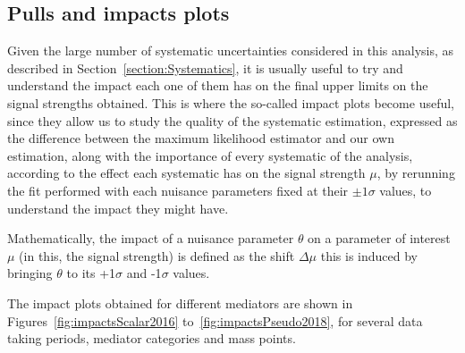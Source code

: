 \documentclass[a4paper, 10pt, openright]{report}
\begin{document}
\begin{appendices}
\chapter{Pulls and impacts plots} \label{appendix:Impact}

Given the large number of systematic uncertainties considered in this analysis, as described in Section~\ref{section:Systematics}, it is usually useful to try and understand the impact each one of them has on the final upper limits on the signal strengths obtained. This is where the so-called impact plots become useful, since they allow us to study the quality of the systematic estimation, expressed as the difference between the maximum likelihood estimator and our own estimation, along with the importance of every systematic of the analysis, according to the effect each systematic has on the signal strength $\mu$, by rerunning the fit performed with each nuisance parameters fixed at their $\pm 1 \sigma$ values, to understand the impact they might have.

Mathematically, the impact of a nuisance parameter $\theta$ on a parameter of interest $\mu$ (in this, the signal strength) is defined as the shift $\Delta \mu$ this is induced by bringing $\theta$ to its +1$\sigma$ and -1$\sigma$ values.

The impact plots obtained for different mediators are shown in Figures~\ref{fig:impactsScalar2016} to~\ref{fig:impactsPseudo2018}, for several data taking periods, mediator categories and mass points.


\end{appendices}
\end{document}
